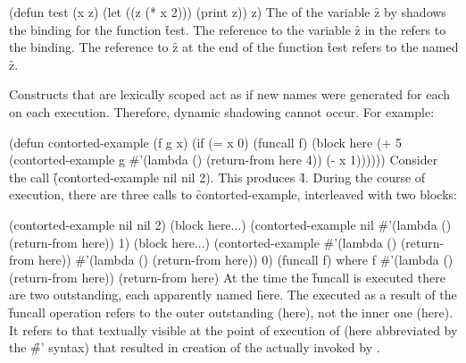 
\code
 (defun test (x z)
   (let ((z (* x 2)))
     (print z))
   z)
\endcode
The  of the variable \f{z} by
 shadows
the  binding for the function \f{test}.  The reference to the
variable \f{z} in the   refers to the  binding.
The reference to \f{z} at the end of the function \f{test} 
refers to the  named \f{z}.

Constructs that are lexically scoped act as if new names were
generated for each  on each execution.  Therefore,
dynamic shadowing cannot occur.  For example:

\code
 (defun contorted-example (f g x)
   (if (= x 0)
       (funcall f)
       (block here
          (+ 5 (contorted-example g
                                  #'(lambda () (return-from here 4))
                                  (- x 1))))))
\endcode
Consider the call \f{(contorted-example nil nil 2)}.  This produces
\f{4}.  During the course of execution, there are three
calls to \f{contorted-example}, interleaved with two 
blocks:

\code
 (contorted-example nil nil 2)
   (block here\ssso ...)
     (contorted-example nil #'(lambda () (return-from here)) 1)
       (block here\ssst ...)
         (contorted-example #'(lambda () (return-from here))
                            #'(lambda () (return-from here))
                            0)
             (funcall f)
                    where f \EV #'(lambda () (return-from here))
                 (return-from here)
\endcode
At the time the \f{funcall} is executed
there are two   outstanding, each apparently
named \f{here}.
The   executed as a result of the \f{funcall}
operation
refers to the outer outstanding 
(here\ssso), not the
inner one (here\ssst).
It
refers to that  textually visible at the point of
execution of 
(here abbreviated by the \f{\#'} syntax) that resulted
in creation of the   actually invoked by 
.                       

